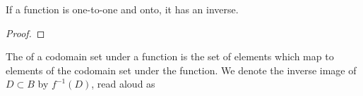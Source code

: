 \begin{prop}
  If a function is one-to-one
  and onto, it has an inverse.

  \begin{proof}
  \end{proof}
\end{prop}


The  of a codomain
set under a function is the set of
elements which map to elements of
the codomain set under the function.
We denote the inverse image of $D \subset B$ by $f^{-1}(D)$, read aloud as 
\strats
